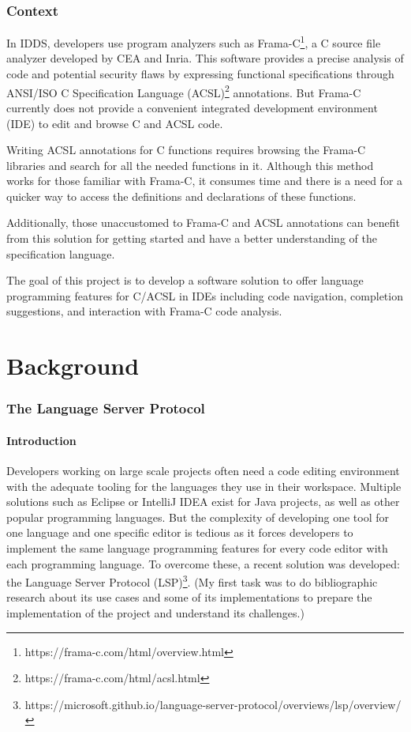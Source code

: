 \documentclass[10pt]{article}
\begin{document}
\begin{singlespace}
\section{Context}
In IDDS, developers use program analyzers such as Frama-C\footnote{https://frama-c.com/html/overview.html}, a C source file analyzer developed by CEA and Inria. This
software provides a precise analysis of code and potential security flaws by expressing functional specifications through ANSI/ISO C Specification Language (ACSL)\footnote{https://frama-c.com/html/acsl.html} annotations. But Frama-C currently does not provide a convenient integrated development environment (IDE) to edit and browse C and ACSL code.

\color{magenta}
Writing ACSL annotations for C functions requires browsing the Frama-C libraries and search for all the needed functions in it. Although this method works for those familiar with Frama-C, it consumes time and there is a need for a quicker way to access the definitions and declarations of these functions.

Additionally, those unaccustomed to Frama-C and ACSL annotations can benefit from this solution for getting started and have a better understanding of the specification language.
\color{black}

The goal of this project is to develop a software solution to offer language programming features for C/ACSL in IDEs including code navigation, completion suggestions, and interaction with Frama-C code analysis.

\part{Background}
\section{The Language Server Protocol}
\subsection{Introduction}
Developers working on large scale projects often need a code editing environment with the adequate tooling for the languages they use in their workspace. Multiple solutions such as Eclipse or IntelliJ IDEA exist for Java projects, as well as other popular programming languages. But the complexity of developing one tool for one language and one specific editor is tedious as it forces developers to implement the same language programming features for every code editor with each programming language. To overcome these, a recent solution was developed: the Language Server Protocol (LSP)\footnote{https://microsoft.github.io/language-server-protocol/overviews/lsp/overview/}. (My first task was to do bibliographic research about its use cases and some of its implementations to prepare the implementation of the project and understand its challenges.)


\end{singlespace}
\end{document}

